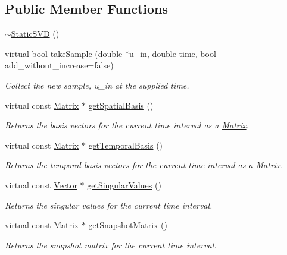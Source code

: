 \subsection*{Public Member Functions}
\begin{DoxyCompactItemize}
\item 
\hyperlink{class_c_a_r_o_m_1_1_static_s_v_d_a38fe9d5c3d8ef47f0e40353078015e7a}{$\sim$\-Static\-S\-V\-D} ()
\item 
virtual bool \hyperlink{class_c_a_r_o_m_1_1_static_s_v_d_a6776aa994a771b6b4a39a96a77f8e6c2}{take\-Sample} (double $\ast$u\-\_\-in, double time, bool add\-\_\-without\-\_\-increase=false)
\begin{DoxyCompactList}\small\item\em Collect the new sample, u\-\_\-in at the supplied time. \end{DoxyCompactList}\item 
virtual const \hyperlink{class_c_a_r_o_m_1_1_matrix}{Matrix} $\ast$ \hyperlink{class_c_a_r_o_m_1_1_static_s_v_d_aafd2a6fe2b2488fb24160d80013a7194}{get\-Spatial\-Basis} ()
\begin{DoxyCompactList}\small\item\em Returns the basis vectors for the current time interval as a \hyperlink{class_c_a_r_o_m_1_1_matrix}{Matrix}. \end{DoxyCompactList}\item 
virtual const \hyperlink{class_c_a_r_o_m_1_1_matrix}{Matrix} $\ast$ \hyperlink{class_c_a_r_o_m_1_1_static_s_v_d_a25750394f6513f0ae99dfd02f513b1da}{get\-Temporal\-Basis} ()
\begin{DoxyCompactList}\small\item\em Returns the temporal basis vectors for the current time interval as a \hyperlink{class_c_a_r_o_m_1_1_matrix}{Matrix}. \end{DoxyCompactList}\item 
virtual const \hyperlink{class_c_a_r_o_m_1_1_vector}{Vector} $\ast$ \hyperlink{class_c_a_r_o_m_1_1_static_s_v_d_abbb6aebb985310c464040746e597a4da}{get\-Singular\-Values} ()
\begin{DoxyCompactList}\small\item\em Returns the singular values for the current time interval. \end{DoxyCompactList}\item 
virtual const \hyperlink{class_c_a_r_o_m_1_1_matrix}{Matrix} $\ast$ \hyperlink{class_c_a_r_o_m_1_1_static_s_v_d_afd8e0bf6c2e53a39e47e7554eba3f8f0}{get\-Snapshot\-Matrix} ()
\begin{DoxyCompactList}\small\item\em Returns the snapshot matrix for the current time interval. \end{DoxyCompactList}\end{DoxyCompactItemize}
